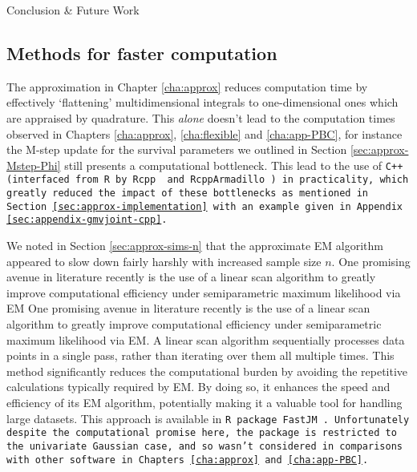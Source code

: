 \begin{chapter}{\label{cha:conclusion}Conclusion \& Future Work}
\subsection{Methods for faster computation}\label{sec:conclusion-future-faster}
The approximation in Chapter \ref{cha:approx} reduces computation time by effectively `flattening' multidimensional integrals to one-dimensional ones which are appraised by quadrature. This \textit{alone} doesn't lead to the computation times observed in Chapters \ref{cha:approx}, \ref{cha:flexible} and \ref{cha:app-PBC}, for instance the M-step update for the survival parameters we outlined in Section \ref{sec:approx-Mstep-Phi} still presents a computational bottleneck. This lead to the use of \tt{C++} (interfaced from \tt{R} by \tt{Rcpp} \citep{R-Rcpp} and \tt{RcppArmadillo} \citep{R-RcppArmadillo}) in practicality, which greatly reduced the impact of these bottlenecks as mentioned in Section \ref{sec:approx-implementation} with an example given in Appendix \ref{sec:appendix-gmvjoint-cpp}.

We noted in Section \ref{sec:approx-sims-n} that the approximate EM algorithm appeared to slow down fairly harshly with increased sample size $n$. One promising avenue in literature recently is the use of a linear scan algorithm to greatly improve computational efficiency under semiparametric maximum likelihood via EM \citep{R-FastJM-Paper} One promising avenue in literature recently is the use of a linear scan algorithm to greatly improve computational efficiency under semiparametric maximum likelihood via EM. A linear scan algorithm sequentially processes data points in a single pass, rather than iterating over them all multiple times. This method significantly reduces the computational burden by avoiding the repetitive calculations typically required by EM. By doing so, it enhances the speed and efficiency of its EM algorithm, potentially making it a valuable tool for handling large datasets. This approach is available in \tt{R} package \tt{FastJM} \citep{R-FastJM}. Unfortunately despite the computational promise here, the package is restricted to the univariate Gaussian case, and so wasn't considered in comparisons with other software in Chapters \ref{cha:approx} and \ref{cha:app-PBC}.


\end{chapter}
